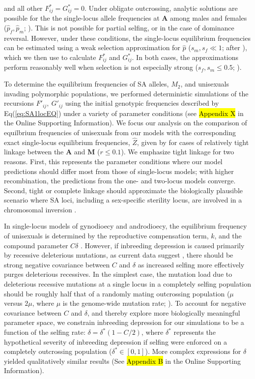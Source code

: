 \documentclass[9pt,twocolumn,twoside,lineno]{gsajnl}
\begin{document}
\noindent and all other $F^{\ast}_{ij} = G^{\ast}_{ij} =0$. Under obligate outcrossing, analytic solutions are possible for the the single-locus allele frequencies at $\mathbf{A}$ among males and females ($\hat{p}_f,\hat{p}_m$; \citealt{Kidwell1977}). This is not possible for partial selfing, or in the case of dominance reversal. However, under these conditions, the single-locus equilibrium frequencies can be estimated using a weak selection approximation for $\hat{p}$ ($s_m,s_f \ll 1$; after \citealt{JordanConnallon2014}), which we then use to calculate $F^{\ast}_{ij}$ and $G^{\ast}_{ij}$. In both cases, the approximations perform reasonably well when selection is not especially strong ($s_f,s_m \leq 0.5$; \citealt{JordanConnallon2014,Olito2017}). 

To determine the equilibrium frequencies of SA alleles, $M_2$, and unisexuals invading polymorphic populations, we performed deterministic simulations of the recursions $F'_{ij},~G'_{ij}$ using the initial genotypic frequencies described by Eq(\ref{eq:SA1locEQ}) under a variety of parameter conditions (see \hl{Appendix X} in the Online Supporting Information). We focus our analysis on the comparison of equilbrium frequencies of unisexuals from our models with the corresponding exact single-locus equilibrium frequencies, $\hat{Z}$, given by \citet{Charlesworth1978a} for cases of relatively tight linkage between the $\mathbf{A}$ and $\mathbf{M}$ ($r\leq 0.1$). We emphasize tight linkage for two reasons. First, this represents the parameter conditions where our model predictions should differ most from those of single-locus models; with higher recombination, the predictions from the one- and two-locus models converge. Second, tight or complete linkage should approximate the biologically plausible scenario where SA loci, including a sex-specific sterility locus, are involved in a chromosomal inversion \citep{LeeKelly2015}.

In single-locus models of gynodioecy and androdioecy, the equilibrium frequency of unisexuals is determined by the reproductive compensation term, $k$, and the compound parameter $C \delta$ \citep{Charlesworth1978a}. However, if inbreeding depression is caused primarily by recessive deleterious mutations, as current data suggest \citep{Charlesworth2009}, there should be strong negative covariance between $C$ and $\delta$ as increased selfing more effectively purges deleterious recessives. In the simplest case, the mutation load due to deleterious recessive mutations at a single locus in a completely selfing population should be roughly half that of a randomly mating outcrossing population ($\mu$ versus $2 \mu$, where $\mu$ is the genome-wide mutation rate; \citealt{OhtaCockerham1974}). To account for negative covariance between $C$ and $\delta$, and thereby explore more biologically meaningful parameter space, we constrain inbreeding depression for our simulations to be a function of the selfing rate: $\delta = \delta^\ast(1 - C/2)$, where $\delta^\ast$ represents the hypothetical severity of inbreeding depression if selfing were enforced on a completely outcrossing population ($\delta^\ast \in [0,1]$). More complex expressions for $\delta$ yielded qualitatively similar results (See \hl{Appendix B} in the Online Supporting Information). 
\end{document}
